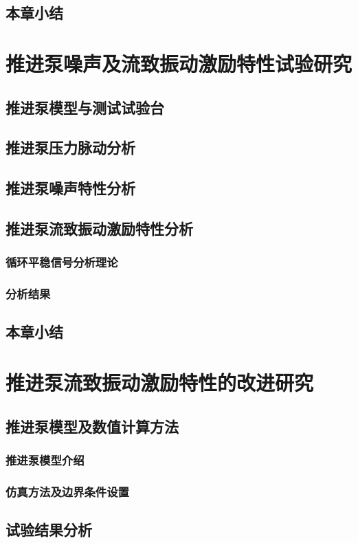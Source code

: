 \section{本章小结}

\chapter{推进泵噪声及流致振动激励特性试验研究}
\section{推进泵模型与测试试验台}
\section{推进泵压力脉动分析}
\section{推进泵噪声特性分析}
\section{推进泵流致振动激励特性分析}
\subsection{循环平稳信号分析理论}
\subsection{分析结果}
\section{本章小结}

\chapter{推进泵流致振动激励特性的改进研究}
\section{推进泵模型及数值计算方法}
\subsection{推进泵模型介绍}
\subsection{仿真方法及边界条件设置}
\section{试验结果分析}
